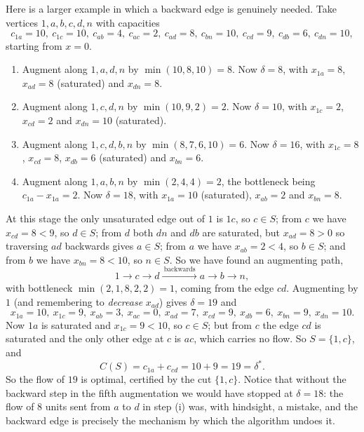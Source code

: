 \documentclass[a4paper]{scrartcl}
\begin{document}
\begin{example}
    Here is a larger example in which a backward edge is genuinely needed. Take vertices $1, a, b, c, d, n$ with capacities
    $$
    c_{1a} = 10,\ c_{1c} = 10,\ c_{ab} = 4,\ c_{ac} = 2,\ c_{ad} = 8,\ c_{bn} = 10,\ c_{cd} = 9,\ c_{db} = 6,\ c_{dn} = 10,
    $$
    starting from $x = 0$.
    \begin{enumerate}[label=(\roman*)]
        \item Augment along $1, a, d, n$ by $\min(10, 8, 10) = 8$. Now $\delta = 8$, with $x_{1a} = 8$, $x_{ad} = 8$ (saturated) and $x_{dn} = 8$.
        \item Augment along $1, c, d, n$ by $\min(10, 9, 2) = 2$. Now $\delta = 10$, with $x_{1c} = 2$, $x_{cd} = 2$ and $x_{dn} = 10$ (saturated).
        \item Augment along $1, c, d, b, n$ by $\min(8, 7, 6, 10) = 6$. Now $\delta = 16$, with $x_{1c} = 8$, $x_{cd} = 8$, $x_{db} = 6$ (saturated) and $x_{bn} = 6$.
        \item Augment along $1, a, b, n$ by $\min(2, 4, 4) = 2$, the bottleneck being $c_{1a} - x_{1a} = 2$. Now $\delta = 18$, with $x_{1a} = 10$ (saturated), $x_{ab} = 2$ and $x_{bn} = 8$.
    \end{enumerate}
    At this stage the only unsaturated edge out of $1$ is $1c$, so $c \in S$; from $c$ we have $x_{cd} = 8 < 9$, so $d \in S$; from $d$ both $dn$ and $db$ are saturated, but $x_{ad} = 8 > 0$ so traversing $ad$ backwards gives $a \in S$; from $a$ we have $x_{ab} = 2 < 4$, so $b \in S$; and from $b$ we have $x_{bn} = 8 < 10$, so $n \in S$. So we have found an augmenting path,
    $$
    1 \rightarrow c \rightarrow d \xrightarrow{\ \text{backwards}\ } a \rightarrow b \rightarrow n,
    $$
    with bottleneck $\min(2, 1, 8, 2, 2) = 1$, coming from the edge $cd$. Augmenting by $1$ (and remembering to \emph{decrease} $x_{ad}$) gives $\delta = 19$ and
    $$
    x_{1a} = 10,\ x_{1c} = 9,\ x_{ab} = 3,\ x_{ac} = 0,\ x_{ad} = 7,\ x_{cd} = 9,\ x_{db} = 6,\ x_{bn} = 9,\ x_{dn} = 10.
    $$
    Now $1a$ is saturated and $x_{1c} = 9 < 10$, so $c \in S$; but from $c$ the edge $cd$ is saturated and the only other edge at $c$ is $ac$, which carries no flow. So $S = \{1, c\}$, and
    $$
    C(S) = c_{1a} + c_{cd} = 10 + 9 = 19 = \delta^*.
    $$
    So the flow of $19$ is optimal, certified by the cut $\{1, c\}$. Notice that without the backward step in the fifth augmentation we would have stopped at $\delta = 18$: the flow of $8$ units sent from $a$ to $d$ in step (i) was, with hindsight, a mistake, and the backward edge is precisely the mechanism by which the algorithm undoes it.
\end{example}
\end{document}
